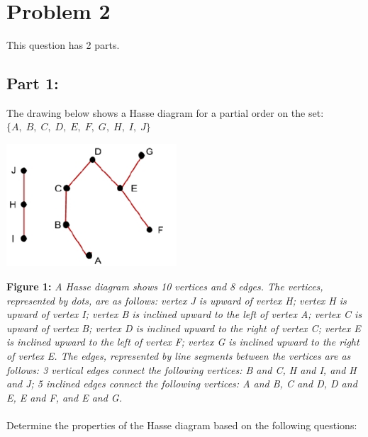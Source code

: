\documentclass{amsart}
\theoremstyle{definition}
\theoremstyle{Exercise}
\theoremstyle{remark}
\theoremstyle{rule}
\numberwithin{equation}{section}
\begin{document}
	~\\
	\section*{Problem 2}
	\noindent
	This question has 2 parts.
	\subsection*{Part 1:}
	The drawing below shows a Hasse diagram for a partial order on the set: \\ $\{A
	, \;B,\; C,\; D,\; E,\; F,\; G,\; H,\; I, \; J\}$
	\begin{center}
		\includegraphics[width=2.5in]{NewHasse}
	\end{center}
	{\color{blue} {\bf Figure 1:} \emph{A Hasse diagram shows 10 vertices and 8 edges. The vertices, represented by dots, are as follows: vertex J is upward of vertex H; vertex H is upward of vertex I; vertex B is inclined upward to the left of vertex A; vertex C is upward of vertex B; vertex D is inclined upward to the right of vertex C; vertex E is inclined upward to the left of vertex F; vertex G is inclined upward to the right of vertex E. The edges, represented by line segments between the vertices are as follows: 3 vertical edges connect the following vertices: B and C, H and I, and H and J; 5 inclined edges connect the following vertices: A and B, C and D, D and E, E and F, and E and G. } }
	\\\\ Determine the properties of the Hasse diagram based on the following
	questions:
\end{document}
